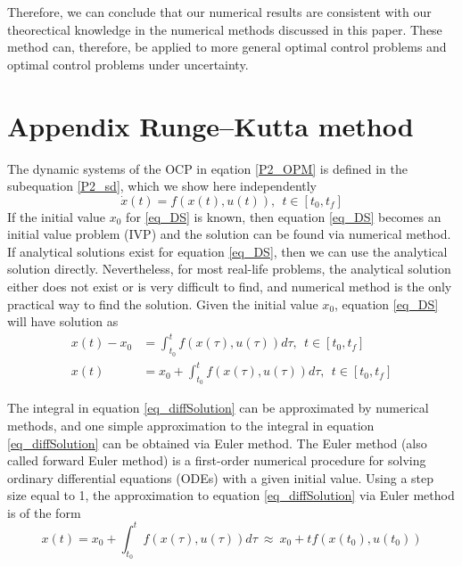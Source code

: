 \documentclass  [
  paper    = a4,
  BCOR     = 10mm,
  twoside,
  fontsize = 12pt,
  fleqn,
  toc      = bibnumbered,
  toc      = listofnumbered,
  numbers  = noendperiod,
  headings = normal,
  listof   = leveldown,
  version  = 3.03
]                                       {scrreprt}
\newcommand{\<}{\langle}
\renewcommand{\>}{\rangle}
\begin{document}
Therefore, we can conclude that our numerical results are consistent with our theorectical knowledge in the numerical methods discussed in this paper. These method can, therefore, be applied to more general optimal control problems and optimal control problems under uncertainty.  
   
\appendix
\chapter{Appendix  Runge–Kutta method}
  	\label{App1}
  	
  	The dynamic systems of the OCP in eqation \ref{P2_OPM} is defined in the subequation 
  	\ref{P2_sd}, which we show here independently
  	\begin{equation}
  		\dot{x} (t) = f(x(t), u(t)), \ \   t \in [t_0, t_f]
  		\label{eq_DS}
  	\end{equation}
  	If the initial value $x_0$ for \ref{eq_DS} is known, then equation \ref{eq_DS} becomes an initial value problem (IVP) and the solution can be found via numerical method. If analytical solutions exist for equation \ref{eq_DS}, then we can use the analytical solution directly. Nevertheless, for most real-life problems, the analytical solution either does not exist or is very difficult to find, and numerical method is the only practical way to find the solution. Given the initial value $x_0$, equation \ref{eq_DS} will have solution as 
  	\begin{equation}\label{eq_diffSolution}
  		\begin{aligned}
  			x(t) -  x_0  &= \int_{t_0}^{t}  f(x(\tau), u(\tau)) d \tau,   \ \ t \in [t_0, t_f] \\ 
  			x(t) & = x_0  + \int_{t_0}^{t}  f(x(\tau), u(\tau)) d \tau,   \ \ t \in [t_0, t_f] 
  		\end{aligned}
  	\end{equation}
  	
  	The integral in equation \ref{eq_diffSolution} can be approximated by numerical methods, and one simple approximation to the integral in equation \ref{eq_diffSolution} can be obtained via Euler method. The Euler method (also called forward Euler method) is a first-order numerical procedure for solving ordinary differential equations (ODEs) with a given initial value. Using a step size equal to 1, the approximation to equation \ref{eq_diffSolution} via Euler method is of the form
  	\begin{equation}
  		x(t)  = x_0  + \int_{t_0}^{t}  f(x(\tau), u(\tau)) d \tau \ \approx \   x_0  + t f(x(t_0), u(t_0))
  		\label{eq_Euler_approx}
  	\end{equation}
  	
\end{document}

